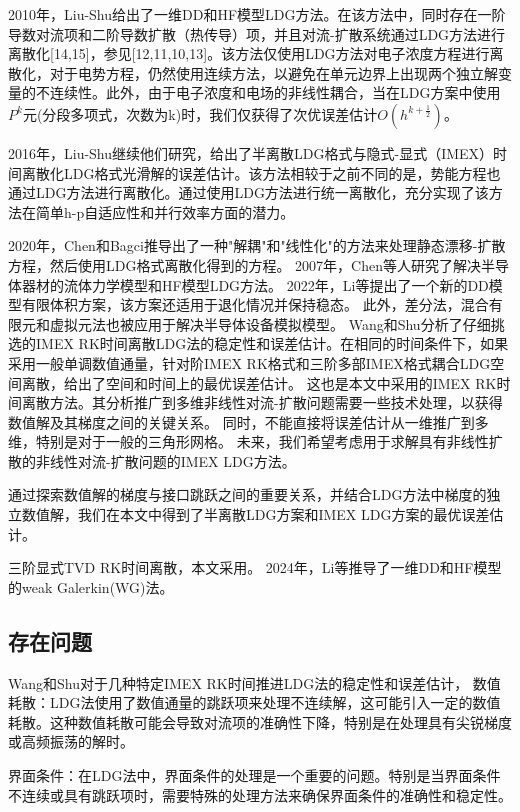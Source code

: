 2010年，Liu-Shu给出了一维DD和HF模型LDG方法\cite{liu2010error}。在该方法中，同时存在一阶导数对流项和二阶导数扩散（热传导）项，并且对流-扩散系统通过LDG方法进行离散化[14,15]，参见[12,11,10,13]。该方法仅使用LDG方法对电子浓度方程进行离散化，对于电势方程，仍然使用连续方法，以避免在单元边界上出现两个独立解变量的不连续性。此外，由于电子浓度和电场的非线性耦合，当在LDG方案中使用$P^k$元(分段多项式，次数为k)时，我们仅获得了次优误差估计$O(h^{k+\frac{1}{2}})$。

2016年，Liu-Shu继续他们研究，给出了半离散LDG格式与隐式-显式（IMEX）时间离散化LDG格式光滑解的误差估计\cite{liu2016analysis}。该方法相较于之前不同的是，势能方程也通过LDG方法进行离散化。通过使用LDG方法进行统一离散化，充分实现了该方法在简单h-p自适应性和并行效率方面的潜力。

2020年，Chen和Bagci推导出了一种"解耦"和"线性化"的方法来处理静态漂移-扩散方程，然后使用LDG格式离散化得到的方程\cite{chen2020steady}。
2007年，Chen等人研究了解决半导体器材的流体力学模型和HF模型LDG方法\cite{chen2007discontinuous}。
2022年，Li等提出了一个新的DD模型有限体积方案，该方案还适用于退化情况并保持稳态\cite{li2022stabilized}。
此外，差分法\cite{ding2019optimal}，混合有限元\cite{gao2018linearized}和虚拟元法\cite{liu2021virtual}也被应用于解决半导体设备模拟模型。
Wang和Shu分析了仔细挑选的IMEX RK时间离散LDG法的稳定性和误差估计\cite{wang2015stability,wang2016stability}。在相同的时间条件下，如果采用一般单调数值通量，针对阶IMEX RK格式和三阶多部IMEX格式耦合LDG空间离散，给出了空间和时间上的最优误差估计。
这也是本文中采用的IMEX RK时间离散方法。其分析推广到多维非线性对流-扩散问题需要一些技术处理，以获得数值解及其梯度之间的关键关系。
同时，不能直接将误差估计从一维推广到多维，特别是对于一般的三角形网格。
未来，我们希望考虑用于求解具有非线性扩散的非线性对流-扩散问题的IMEX LDG方法。

通过探索数值解的梯度与接口跳跃之间的重要关系，并结合LDG方法中梯度的独立数值解，我们在本文中得到了半离散LDG方案和IMEX LDG方案的最优误差估计。

三阶显式TVD RK时间离散\cite{shu1988efficient}，本文采用。
2024年，Li等推导了一维DD和HF模型的weak Galerkin(WG)法\cite{li2024weak}。
\subsection{存在问题}
Wang和Shu对于几种特定IMEX RK时间推进LDG法的稳定性和误差估计，
数值耗散：LDG法使用了数值通量的跳跃项来处理不连续解，这可能引入一定的数值耗散。这种数值耗散可能会导致对流项的准确性下降，特别是在处理具有尖锐梯度或高频振荡的解时。

界面条件：在LDG法中，界面条件的处理是一个重要的问题。特别是当界面条件不连续或具有跳跃项时，需要特殊的处理方法来确保界面条件的准确性和稳定性。


